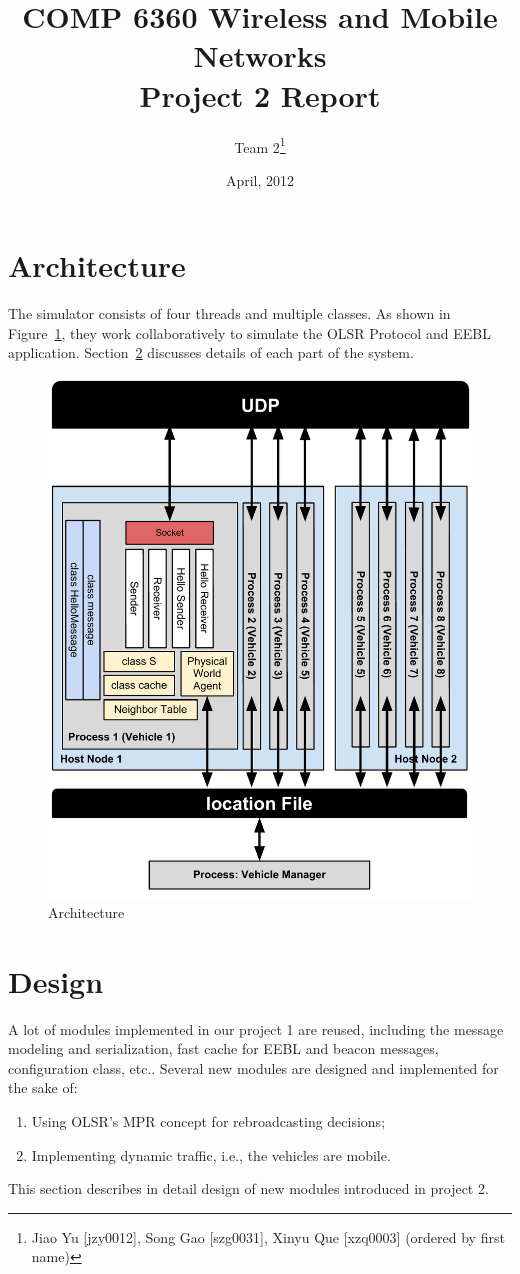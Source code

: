 \documentclass[twocolumn]{article}
\title{COMP 6360 Wireless and Mobile Networks \\ Project 2 Report}
\author{Team 2\thanks{Jiao Yu [jzy0012], Song Gao [szg0031], Xinyu Que [xzq0003] (ordered by first name)}}
\date{April, 2012}
\begin{document}
\maketitle

\section{Architecture}
\par{The simulator consists of four threads and multiple classes. As shown in Figure~\ref{fig:arch}, they work collaboratively to simulate the OLSR Protocol and EEBL application. Section~\ref{sec:design} discusses details of each part of the system.}
\begin{figure}[htb]
\includegraphics[width=\columnwidth]{fig/arch.pdf}
\caption{Architecture}
\label{fig:arch}
\end{figure}

\section{Design}
\label{sec:design}
\par{A lot of modules implemented in our project 1 are reused, including the message modeling and serialization, fast cache for EEBL and beacon messages, configuration class, etc.. Several new modules are designed and implemented for the sake of:
    \begin{enumerate}
    \item Using OLSR's MPR concept for rebroadcasting decisions;
    \item Implementing dynamic traffic, i.e., the vehicles are mobile.
        \end{enumerate}
    This section describes in detail design of new modules introduced in project 2.}
\end{document}
